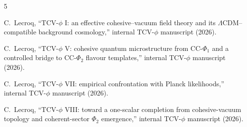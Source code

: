 \documentclass[aps,prd,onecolumn,nofootinbib,superscriptaddress]{revtex4-2}
\begin{document}
\begin{thebibliography}{5}

C.~Lecroq,
``TCV-$\phi$ I: an effective cohesive--vacuum field theory and its $\Lambda$CDM--compatible background cosmology,''
internal TCV-$\phi$ manuscript (2026).

C.~Lecroq,
``TCV-$\phi$ V: cohesive quantum microstructure from CC-$\Phi_1$ and a controlled bridge to CC-$\Phi_2$ flavour templates,''
internal TCV-$\phi$ manuscript (2026).

C.~Lecroq,
``TCV-$\phi$ VII: empirical confrontation with Planck likelihoods,''
internal TCV-$\phi$ manuscript (2026).

C.~Lecroq,
``TCV-$\phi$ VIII: toward a one-scalar completion from cohesive-vacuum topology and coherent-sector $\Phi_2$ emergence,''
internal TCV-$\phi$ manuscript (2026).

\end{thebibliography}
\end{document}
